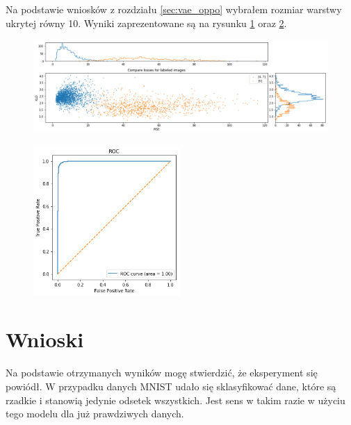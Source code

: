 Na podstawie wniosków z rozdziału \ref{sec:vae_oppo} wybrałem rozmiar warstwy ukrytej równy 10. Wyniki zaprezentowane są na rysunku \ref{fig:mnist_compare} oraz \ref{fig:mnist_roc}.

\begin{figure}[h!]
    \centering
    \includegraphics[width=1.0\textwidth]{images/mnist_compare}
    \caption{}
    \label{fig:mnist_compare}
\end{figure}

\begin{figure}[h!]
    \centering
    \includegraphics[width=0.5\textwidth]{images/mnist_roc}
    \caption{}
    \label{fig:mnist_roc}
\end{figure}

\section{Wnioski}

Na podstawie otrzymanych wyników mogę stwierdzić, że eksperyment się powiódł. W przypadku danych MNIST udało się sklasyfikować dane, które są rzadkie i stanowią jedynie odsetek wszystkich. Jest sens w takim razie w użyciu tego modelu dla już prawdziwych danych.
